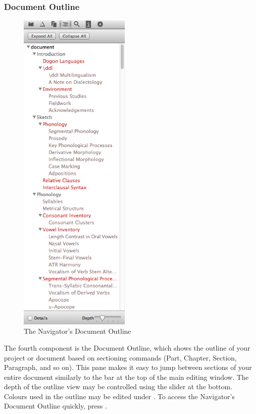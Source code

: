 \subsubsection{Document Outline}
\begin{figure}
\includegraphics[width=0.48\textwidth, trim = 0 8.75in 0 0, clip = true]{TeXnicle-Images/texnicle-nav-docoutline.png}
\caption{The Navigator's Document Outline}
\label{fig:texnicle-nav-docoutline}
\end{figure}
The fourth component is the Document Outline, which shows the outline of your project or document based on sectioning commands (Part, Chapter, Section, Paragraph, and so on). This pane makes it easy to jump between sections of your entire document similarly to the  bar at the top of the main editing window. The depth of the outline view may be controlled using the slider at the bottom. Colours used in the outline may be edited under . To access the Navigator's Document Outline quickly, press .

